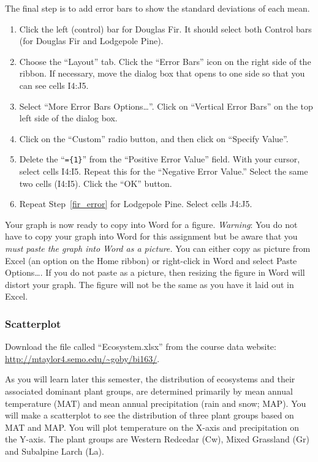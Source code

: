 \documentclass[12pt, hidelinks]{exam}
\newcommand{\VSpace}{\vspace{\baselineskip}}
\begin{document}
The final step is to add error bars to show the standard deviations of each mean.

\begin{enumerate}[resume]

	\item Click the left (control) bar for Douglas Fir. It should select both Control bars (for Douglas Fir and Lodgepole Pine). 
	
	\item Choose the “Layout” tab. Click the “Error Bars” icon on the right side of the ribbon. If necessary, move the dialog box that opens to one side so that you can see cells I4:J5.
	
	\item Select “More Error Bars Options\dots”. Click on “Vertical Error Bars” on the top left side of the dialog box.
	
	\item Click on the “Custom” radio button, and then click on “Specify Value”.
	
	\item \label{fir_error} Delete the “\texttt{=\{1\}}” from the “Positive Error Value” field. With your cursor, select cells I4:I5. Repeat this for the “Negative Error Value.” Select the same two cells (I4:I5). Click the “OK” button.
	
	\item Repeat Step~\ref{fir_error} for Lodgepole Pine. Select cells J4:J5.
	
\end{enumerate}

Your graph is now ready to copy into Word for a figure. \emph{Warning}: You do not have to copy your graph into Word for this assignment but be aware that you \emph{must paste the graph into Word as a picture.} You can either copy as picture from Excel (an option on the Home ribbon) or right-click in Word and select Paste Options\dots. If you do not paste as a picture, then resizing the figure in Word will distort your graph. The figure will not be the same as you have it laid out in Excel.

\subsubsection*{Scatterplot}

Download the file called “Ecosystem.xlsx” from the course data website: \url{http://mtaylor4.semo.edu/~goby/bi163/}.\VSpace

As you will learn later this semester, the distribution of ecosystems and their associated dominant plant groups, are determined primarily by mean annual temperature (MAT) and mean annual precipitation (rain and snow; MAP). You will make a scatterplot to see the distribution of three plant groups based on MAT and MAP. You will plot temperature on the X-axis and precipitation on the Y-axis. The plant groups are Western Redcedar (Cw), Mixed Grassland (Gr) and Subalpine Larch (La). 
\end{document}

